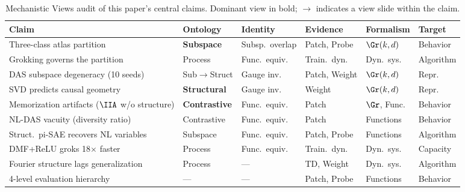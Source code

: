 \vspace{1em}
\begin{table}[H]
\centering
\caption{Mechanistic Views audit of this paper's central claims.
Dominant view in bold; $\to$ indicates a view slide within the claim.}
\label{tab:mechviews}
\small
\setlength{\tabcolsep}{4.5pt}
\renewcommand{\arraystretch}{1.25}
\begin{tabular}{@{}p{4.8cm}p{1.8cm}p{1.8cm}p{2.0cm}p{1.6cm}p{1.4cm}@{}}
\toprule
\textbf{Claim} & \textbf{Ontology} & \textbf{Identity} & \textbf{Evidence} & \textbf{Formalism} & \textbf{Target} \\
\midrule
Three-class atlas partition
  & \textbf{Subspace} & Subsp.\ overlap & Patch, Probe & $\Gr(k,d)$ & Behavior \\
Grokking governs the partition
  & Process & Func.\ equiv. & Train.\ dyn. & Dyn.\ sys. & Algorithm \\
DAS subspace degeneracy (10 seeds)
  & Sub$\to$Struct & Gauge inv. & Patch, Weight & $\Gr(k,d)$ & Repr. \\
SVD predicts causal geometry
  & \textbf{Structural} & Gauge inv. & Weight & $\Gr(k,d)$ & Repr. \\
Memorization artifacts ($\IIA$ w/o structure)
  & \textbf{Contrastive} & Func.\ equiv. & Patch & $\Gr$, Func. & Behavior \\
NL-DAS vacuity (diversity ratio)
  & Contrastive & Func.\ equiv. & Patch & Functions & Behavior \\
Struct.\ pi-SAE recovers NL variables
  & Subspace & Func.\ equiv. & Patch, Probe & Functions & Algorithm \\
DMF+ReLU groks 18$\times$ faster
  & Process & Func.\ equiv. & Train.\ dyn. & Dyn.\ sys. & Capacity \\
Fourier structure lags generalization
  & Process & --- & TD, Weight & Dyn.\ sys. & Algorithm \\
4-level evaluation hierarchy
  & --- & --- & Patch, Probe & Functions & Behavior \\
\bottomrule
\end{tabular}
\renewcommand{\arraystretch}{1.0}
\end{table}
